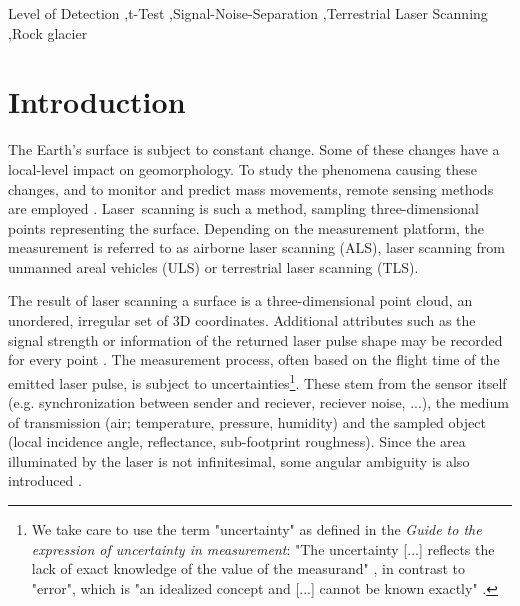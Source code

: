 \documentclass[preprint,12pt,3p]{elsarticle}
\begin{document}
\begin{frontmatter}
\begin{keyword}
Level of Detection \sep t-Test \sep Signal-Noise-Separation \sep Terrestrial Laser Scanning \sep Rock glacier


\end{keyword}

\end{frontmatter}

\linenumbers



\section{Introduction}
\label{sec:introduction}

The Earth's surface is subject to constant change. Some of these changes have a local-level impact on geomorphology. To study the phenomena causing these changes, and to monitor and predict mass movements, remote sensing methods are employed \citep{Brodu_Lague_2012, Eitel2016}. Laser~scanning is such a method, sampling three-dimensional points representing the surface. Depending on the measurement platform, the measurement is referred to as airborne laser scanning (ALS), laser scanning from unmanned areal vehicles (ULS) or terrestrial laser scanning (TLS).


The result of laser scanning a surface is a three-dimensional point cloud, an unordered, irregular set of 3D coordinates. Additional attributes such as the signal strength or information of the returned laser pulse shape may be recorded for every point \citep{Otepka_2013}. The measurement process, often based on the flight time of the emitted laser pulse, is subject to uncertainties\footnote{We take care to use the term "uncertainty" as defined in the \emph{Guide to the expression of uncertainty in measurement}: "The uncertainty [...] reflects the lack of exact knowledge of the value of the measurand" \citep{gum}, in contrast to "error", which is "an idealized concept and [...] cannot be known exactly" \citep{gum}. }. These stem from the sensor itself (e.g. synchronization between sender and reciever, reciever noise, ...), the medium of transmission (air; temperature, pressure, humidity) and the sampled object (local incidence angle, reflectance, sub-footprint roughness). Since the area illuminated by the laser is not infinitesimal, some angular ambiguity is also introduced \citep{Lichti_Jamtsho_2006, pfeifer2007investigating, Zame_2014, Wujanz_2017}.
\end{document}

